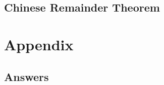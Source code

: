 \documentclass{article}
\begin{document}
\subsection{Chinese Remainder Theorem}

\section{}

\section{Appendix}

\subsection{Answers}
\end{document}
